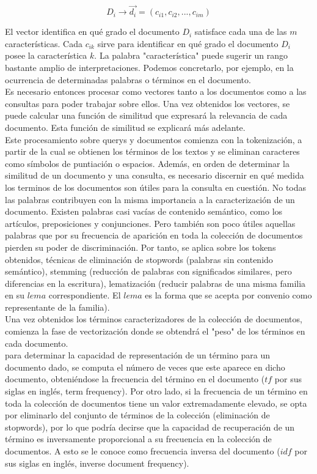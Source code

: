 \documentclass[runningheads,a4paper]{llncs}
\begin{document}
$$ D_i \rightarrow \vec{d_i} = (c_{i1}, c_{i2}, ... , c_{im})$$

El vector identifica en qué grado el documento $D_i$ satisface cada una de las $m$ características. Cada $c_{ik}$ sirve para identificar en qué grado el documento $D_i$ posee la característica $k$. La palabra "característica" puede sugerir un rango bastante amplio de interpretaciones. Podemos concretarlo, por ejemplo, en la ocurrencia de determinadas palabras o términos en el documento.\\

Es necesario entonces procesar como vectores tanto a los documentos como a las consultas para poder trabajar sobre ellos. Una vez obtenidos los vectores, se puede calcular una función de similitud que expresará la relevancia de cada documento. Esta función de similitud se explicará más adelante. \\
Este procesamiento sobre querys y documentos comienza con la tokenización, a partir de la cual se obtienen los términos de los textos y se eliminan caracteres como símbolos de puntiación o espacios. Además, en orden de determinar la similitud de un documento y una consulta, es necesario discernir en qué medida los terminos de los documentos son útiles para la consulta en cuestión. No todas las palabras contribuyen con la misma importancia a la caracterización de un documento. Existen palabras casi vacías de contenido semántico, como los artículos, preposiciones y conjunciones. Pero también son poco útiles aquellas palabras que por su frecuencia de aparición en toda la colección de documentos pierden su poder de discriminación. Por tanto, se aplica sobre los tokens obtenidos, técnicas de eliminación de stopwords (palabras sin contenido semántico), stemming (reducción de palabras con significados similares, pero diferencias en la escritura), lematización (reducir palabras de una misma familia en su $lema$ correspondiente. El $lema$ es la forma que se acepta por convenio como representante de la familia). \\

Una vez obtenidos los términos caracterizadores de la colección de documentos, comienza la fase de vectorización donde se obtendrá el "peso" de los términos en cada documento.\\
para determinar la capacidad de representación de un término para un documento dado, se computa el número de veces que este aparece en dicho documento, obteniéndose la frecuencia del término en el documento ($tf$ por sus siglas en inglés, term frequency). Por otro lado, si la frecuencia de un término en toda la colección de documentos tiene un valor extremadamente elevado, se opta por eliminarlo del conjunto de términos de la colección (eliminación de stopwords), por lo que podría decirse que la capacidad de recuperación de un término es inversamente proporcional a su frecuencia en la colección de documentos. A esto se le conoce como frecuencia inversa del documento ($idf$ por sus siglas en inglés, inverse document frequency).\\
\end{document}
